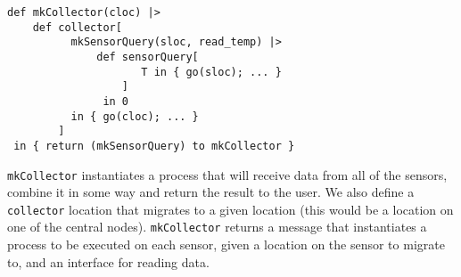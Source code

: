\begin{verbatim}
def mkCollector(cloc) |>
    def collector[
          mkSensorQuery(sloc, read_temp) |>
              def sensorQuery[
                     T in { go(sloc); ... }
                  ]
               in 0
          in { go(cloc); ... }
        ]
 in { return (mkSensorQuery) to mkCollector }
\end{verbatim}
\verb!mkCollector! instantiates a process that will receive data
from all of the sensors, combine it in some way and return the
result to the user. We also define a \verb!collector! location that
migrates to a given location (this would be a location on one of
the central nodes). \verb!mkCollector! returns a message that
instantiates a process to be executed on each sensor, given a
location on the sensor to migrate to, and an interface for reading
data.

